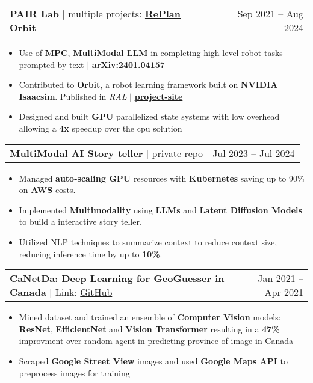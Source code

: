 \documentclass[letterpaper,11pt]{article}
\makeatletter
\newcommand{\resumeItem}[1]{
  \item\small{
    {#1 \vspace{-2pt}}
  }
}
\newcommand{\resumeProjectHeading}[2]{
    \item
    \begin{tabular*}{0.97\textwidth}{l@{\extracolsep{\fill}}r}
      \small#1 & #2 \\
    \end{tabular*}\vspace{-9pt}
}
\newcommand{\resumeItemListStart}{\begin{itemize}}
\newcommand{\resumeItemListEnd}{\end{itemize}\vspace{-7pt}}
\makeatother
\begin{document}
      \resumeProjectHeading
        {\textbf{PAIR Lab} | multiple projects: \href{https://arxiv.org/abs/2401.04157}{\textbf{RePlan}}  $|$ \href{https://isaac-orbit.github.io/}{\textbf{Orbit}}}{Sep 2021 -- Aug 2024}
        \resumeItemListStart
          \resumeItem{Use of \textbf{MPC}, \textbf{MultiModal LLM} in completing high level robot tasks prompted by text $|$ \href{https://arxiv.org/abs/2401.04157}{\textbf{arXiv:2401.04157}}}
          \resumeItem{Contributed to \textbf{Orbit}, a robot learning framework built on \textbf{NVIDIA Isaacsim}. Published in \textit{RAL} $|$ \href{https://isaac-orbit.github.io/}{\textbf{project-site}}}
          \resumeItem{Designed and built \textbf{GPU} parallelized state systems with low overhead allowing a \textbf{4x} speedup over the cpu solution}
        \resumeItemListEnd
      \resumeProjectHeading
          {\textbf{MultiModal AI Story teller}  $|$ private repo}{Jul 2023 -- Jul 2024}
          \resumeItemListStart
            \resumeItem{Managed \textbf{auto-scaling GPU} resources with \textbf{Kubernetes} saving up to 90\% on \textbf{AWS} costs.}
            \resumeItem{Implemented \textbf{Multimodality} using \textbf{LLMs} and \textbf{Latent Diffusion Models} to build a interactive story teller.}
            \resumeItem{Utilized NLP techniques to summarize context to reduce context size, reducing inference time by up to \textbf{10\%}.}
          \resumeItemListEnd
      \resumeProjectHeading
          {\textbf{CaNetDa: Deep Learning for GeoGuesser in Canada} $|$ Link: \href{https://github.com/st-tran/CSC413-Project}{GitHub}}{Jan 2021 -- Apr 2021}
          \resumeItemListStart
            \resumeItem{Mined dataset and trained an ensemble of \textbf{Computer Vision} models: \textbf{ResNet}, \textbf{EfficientNet} and \textbf{Vision Transformer} resulting in a \textbf{47\%} improvment over random agent in predicting province of image in Canada}
            \resumeItem{Scraped \textbf{Google Street View} images and used \textbf{Google Maps API} to preprocess images for training}
          \resumeItemListEnd
\end{document}
